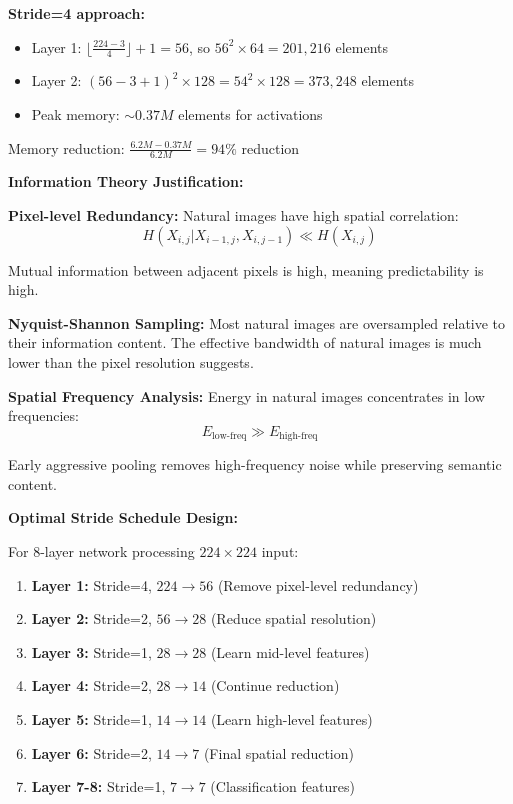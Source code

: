 \documentclass[12pt]{article}
\begin{document}
\begin{enumerate}[(a)]
{    \textbf{Stride=4 approach:}
    \begin{itemize}
        \item Layer 1: $\lfloor\frac{224-3}{4}\rfloor + 1 = 56$, so $56^2 \times 64 = 201,216$ elements
        \item Layer 2: $(56-3+1)^2 \times 128 = 54^2 \times 128 = 373,248$ elements
        \item Peak memory: $\sim 0.37M$ elements for activations
    \end{itemize}
    
    Memory reduction: $\frac{6.2M - 0.37M}{6.2M} = 94\%$ reduction
    
    \textbf{Information Theory Justification:}
    
    \textbf{Pixel-level Redundancy:}
    Natural images have high spatial correlation:
    $$H(X_{i,j} | X_{i-1,j}, X_{i,j-1}) \ll H(X_{i,j})$$
    
    Mutual information between adjacent pixels is high, meaning predictability is high.
    
    \textbf{Nyquist-Shannon Sampling:}
    Most natural images are oversampled relative to their information content. The effective bandwidth of natural images is much lower than the pixel resolution suggests.
    
    \textbf{Spatial Frequency Analysis:}
    Energy in natural images concentrates in low frequencies:
    $$E_{\text{low-freq}} \gg E_{\text{high-freq}}$$
    
    Early aggressive pooling removes high-frequency noise while preserving semantic content.
    
    \textbf{Optimal Stride Schedule Design:}
    
    For 8-layer network processing $224 \times 224$ input:
    
    \begin{enumerate}
        \item \textbf{Layer 1:} Stride=4, $224 \rightarrow 56$ (Remove pixel-level redundancy)
        \item \textbf{Layer 2:} Stride=2, $56 \rightarrow 28$ (Reduce spatial resolution)
        \item \textbf{Layer 3:} Stride=1, $28 \rightarrow 28$ (Learn mid-level features)
        \item \textbf{Layer 4:} Stride=2, $28 \rightarrow 14$ (Continue reduction)
        \item \textbf{Layer 5:} Stride=1, $14 \rightarrow 14$ (Learn high-level features)
        \item \textbf{Layer 6:} Stride=2, $14 \rightarrow 7$ (Final spatial reduction)
        \item \textbf{Layer 7-8:} Stride=1, $7 \rightarrow 7$ (Classification features)
    \end{enumerate}
    
}
\end{enumerate}
\end{document}
